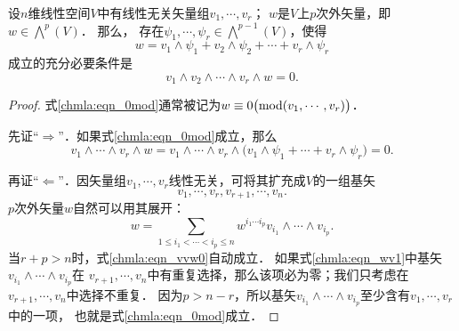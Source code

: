 \begin{theorem}\label{chmla:thm_0mod}
    设$n$维线性空间$V$中有线性无关矢量组$v_1,\cdots,v_r$；
    $w$是$V$上$p$次外矢量，即$w\in \bigwedge^p(V)$．    那么，
    存在$\psi_1,\cdots,\psi_r \in \bigwedge^{p-1}(V)$，使得
    \begin{equation} \label{chmla:eqn_0mod}
        w=v_1 \wedge \psi_1 + v_2 \wedge \psi_2 +\cdots +v_r \wedge \psi_r
    \end{equation}
    成立的充分必要条件是
    \begin{equation}\label{chmla:eqn_vvw0}
       v_1 \wedge v_2\wedge \cdots \wedge v_r \wedge w =0 .
    \end{equation}
\end{theorem}
\begin{proof}
    式\eqref{chmla:eqn_0mod}通常被记为$w\equiv 0\bigl({\rm mod}(v_1,\cdots,v_r)\bigr)$．

    先证“$\Rightarrow$”．如果式\eqref{chmla:eqn_0mod}成立，那么
    \begin{equation}
        v_1 \wedge \cdots \wedge v_r \wedge w=  v_1 \wedge \cdots \wedge v_r \wedge
        \bigl(v_1 \wedge \psi_1+ \cdots +v_r \wedge \psi_r\bigr)    =0 .
    \end{equation}

    再证“$\Leftarrow$”．因矢量组$v_1,\cdots,v_r$线性无关，可将其扩充成$V$的一组基矢
    \begin{equation*}
        v_1,\cdots,v_r, v_{r+1},\cdots,v_n .
    \end{equation*}
    $p$次外矢量$w$自然可以用其展开：
    \begin{equation}\label{chmla:eqn_wv1}
        w = \sum_{1\leqslant {i_1} < \cdots <i_p  \leqslant n }
          w^{i_1\cdots i_p} v_{i_1}\wedge \cdots \wedge v_{i_p} .
    \end{equation}
    当$r+p>n$时，式\eqref{chmla:eqn_vvw0}自动成立．
    如果式\eqref{chmla:eqn_wv1}中基矢$v_{i_1}\wedge \cdots \wedge v_{i_p}$在
    $v_{r+1},\cdots,v_n$中有重复选择，那么该项必为零；我们只考虑在$v_{r+1},\cdots,v_n$中选择不重复．
    因为$p>n-r$，所以基矢$v_{i_1}\wedge \cdots \wedge v_{i_p}$至少含有$v_1,\cdots,v_r$中的一项，
    也就是式\eqref{chmla:eqn_0mod}成立．


\end{proof}

